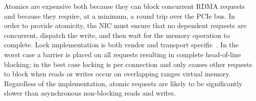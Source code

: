 Atomics are expensive both because they can block concurrent RDMA
requests and because they require, at a minimum, a round trip over
the PCIe bus.
In order to provide atomicity, the NIC must ensure
that no dependent requests are concurrent, dispatch the write, and
then wait for the memory operation to complete.
Lock implementation is both vendor and
transport specific~\cite{design-guidelines}. In the worst case a
barrier is placed on all requests resulting in complete head-of-line
blocking; in the best case locking is per connection and only causes
other requests to block when reads or writes occur on overlapping
ranges virtual memory. Regardless of the implementation, atomic
requests are likely to be significantly slower than asynchronous non-blocking
reads and writes.





